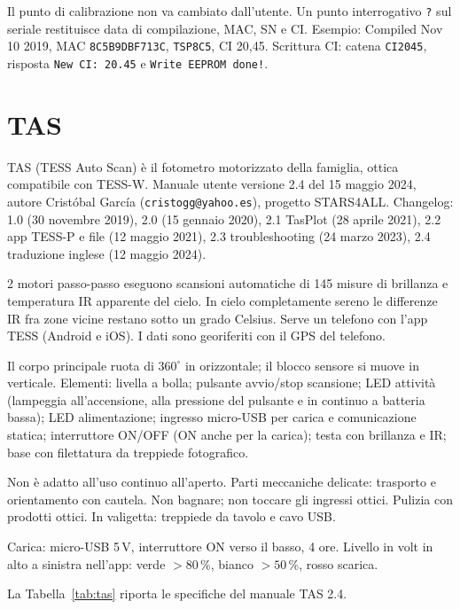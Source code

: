 \documentclass[11pt,a4paper]{report}
\begin{document}
Il punto di calibrazione non va cambiato dall'utente. Un punto interrogativo \texttt{?} sul seriale restituisce data di compilazione, MAC, SN e CI. Esempio: Compiled Nov 10 2019, MAC \texttt{8C5B9DBF713C}, \texttt{TSP8C5}, CI 20,45. Scrittura CI: catena \texttt{CI2045}, risposta \texttt{New CI: 20.45} e \texttt{Write EEPROM done!}.

\chapter{TAS}

TAS (TESS Auto Scan) è il fotometro motorizzato della famiglia, ottica compatibile con TESS-W. Manuale utente versione 2.4 del 15 maggio 2024, autore Cristóbal García (\texttt{cristogg@yahoo.es}), progetto STARS4ALL. Changelog: 1.0 (30 novembre 2019), 2.0 (15 gennaio 2020), 2.1 TasPlot (28 aprile 2021), 2.2 app TESS-P e file (12 maggio 2021), 2.3 troubleshooting (24 marzo 2023), 2.4 traduzione inglese (12 maggio 2024).

2 motori passo-passo eseguono scansioni automatiche di 145 misure di brillanza e temperatura IR apparente del cielo. In cielo completamente sereno le differenze IR fra zone vicine restano sotto un grado Celsius. Serve un telefono con l'app TESS (Android e iOS). I dati sono georiferiti con il GPS del telefono.

Il corpo principale ruota di $360^\circ$ in orizzontale; il blocco sensore si muove in verticale. Elementi: livella a bolla; pulsante avvio/stop scansione; LED attività (lampeggia all'accensione, alla pressione del pulsante e in continuo a batteria bassa); LED alimentazione; ingresso micro-USB per carica e comunicazione statica; interruttore ON/OFF (ON anche per la carica); testa con brillanza e IR; base con filettatura da treppiede fotografico.

Non è adatto all'uso continuo all'aperto. Parti meccaniche delicate: trasporto e orientamento con cautela. Non bagnare; non toccare gli ingressi ottici. Pulizia con prodotti ottici. In valigetta: treppiede da tavolo e cavo USB.

Carica: micro-USB 5\,V, interruttore ON verso il basso, 4 ore. Livello in volt in alto a sinistra nell'app: verde $>80$\,\%, bianco $>50$\,\%, rosso scarica.

La Tabella~\ref{tab:tas} riporta le specifiche del manuale TAS 2.4.
\end{document}
